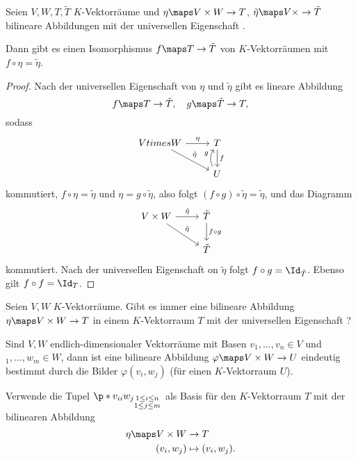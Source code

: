 \begin{lemma}
  Seien \( V,W,T,\tilde{T} \) \( K \)-Vektorräume und \( \eta\maps V\times W\to T \), \( \tilde{\eta}\maps V\times \to \tilde{T} \) bilineare Abbildungen mit der universellen Eigenschaft \tensorproperty.

  Dann gibt es einen Isomorphismus \( f\maps T\to \tilde{T} \) von \( K \)-Vektorräumen mit \( f\circ \eta=\tilde{\eta} \).
\end{lemma}
\begin{proof}
  Nach der universellen Eigenschaft \tensorproperty von \( \eta \) und \( \tilde{\eta} \) gibt es lineare Abbildung
  \begin{equation*}
    f\maps T\to \tilde{T},\quad g\maps \tilde{T}\to T,
  \end{equation*}
  sodass
  \begin{equation*}
    \begin{tikzcd}
      V times W\arrow[r,"\eta"]\arrow[dr,"\tilde{\eta}"]&T\arrow[d,"f"]\\
      &U \arrow[u,bend left,"g"]
    \end{tikzcd}
  \end{equation*}
  kommutiert, \dh \( f\circ \eta=\tilde{\eta} \) und \( \eta=g\circ \tilde{\eta} \), also folgt \( (f\circ g)\circ \tilde{\eta}=\tilde{\eta} \), und das Diagramm
  \begin{equation*}
    \begin{tikzcd}
      V\times W \arrow[r,"\tilde{\eta}"]\arrow[dr,"\tilde{\eta}"]&\tilde{T}\arrow[d,"f\circ g"]\\
      &\tilde{T}
    \end{tikzcd}
  \end{equation*}
  kommutiert. Nach der universellen Eigenschaft \tensorproperty on \( \tilde{\eta} \) folgt \( f\circ g=\Id_{\tilde{T}} \). Ebenso gilt \( f\circ f=\Id_{T} \).
\end{proof}
\begin{frage*}
  Seien \( V,W \) \( K \)-Vektorräume. Gibt es immer eine bilineare Abbildung \( \eta\maps V\times W\to T \) in einem \( K \)-Vektorraum \( T \) mit der universellen Eigenschaft \tensorproperty?
\end{frage*}
\begin{idee*}
  Sind \( V,W \) endlich-dimensionaler Vektorräume mit Basen \( v_1,\dotsc,v_n\in V \) und \( _1,\dotsc,w_m\in W \), dann ist eine bilineare Abbildung \( \varphi\maps V\times W\to U \) eindeutig bestimmt durch die Bilder \( \varphi(v_i,w_j) \) (für einen \( K \)-Vektorraum \( U \)).

  Verwende die Tupel \( \p*{v_{ii}w_j}_{\substack{1\leq i\leq n\\ 1\leq j\leq m}} \) als Basis für den \( K \)-Vektorraum \( T \) mit der bilinearen Abbildung
\begin{align*}
  \eta\maps V\times W&\to T\\
  (v_i,w_j)&\mapsto (v_i,w_j).
\end{align*}
\end{idee*}
